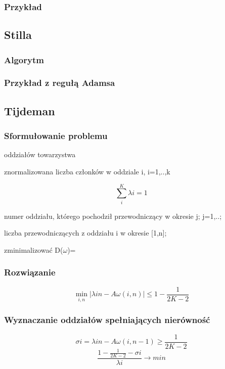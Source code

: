 \documentclass[12pt,a4paper]{article}
\begin{document}
\subsubsection{Przykład}
\subsection{Stilla}
\subsubsection{Algorytm}
\subsubsection{Przykład z regułą Adamsa}
\newpage
\subsection{Tijdeman}
\subsubsection{Sformułowanie problemu}
\begin{description}
\item[k] oddziałów towarzystwa
\item[$\lambda$i] znormalizowana liczba członków w oddziale i, i=1,..,k
\item \begin{equation}
\sum \limits_{i}^{K} \lambda i = 1
\end{equation}
\item[$\omega$i] numer oddziału, którego pochodził przewodniczący w okresie j; j=1,..;
\item[A$\omega$(i,n)] liczba przewodniczących z oddziału i w okresie [1,n]; 
\item zminimalizować D($\omega$)=
\end{description}

\subsubsection{Rozwiązanie}
\begin{equation}
\min\limits_{i,n}\left | \lambda in - A\omega(i,n)\right | \leq 1-\frac{1}{2K-2}
\end{equation}
\subsubsection{Wyznaczanie oddziałów spełniających nierówność}
\begin{equation}
\sigma i = \lambda in - A\omega (i,n-1) \geq \frac{1}{2K-2}
\end{equation}
\begin{equation}
\frac{1-\frac{1}{2K-2}-\sigma i}{\lambda i} \to min
\end{equation}
\end{document}
